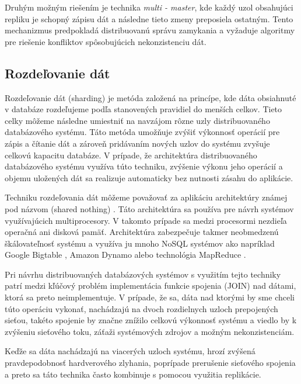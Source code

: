 \documentclass[11pt,twoside,a4paper]{book}
\begin{document}
Druhým možným riešením je technika \emph{multi - master}, kde každý uzol obsahujúci repliku je schopný zápisu dát a následne tieto zmeny preposiela ostatným. Tento mechanizmus predpokladá distribuovanú správu zamykania a vyžaduje algoritmy pre riešenie konfliktov spôsobujúcich nekonzistenciu dát.


\subsection{Rozdeľovanie dát}

Rozdeľovanie dát (sharding) je metóda založená na princípe, kde dáta obsiahnuté v databáze rozdeľujeme podľa stanovených pravidiel do menších celkov. Tieto celky môžeme následne umiestniť na navzájom rôzne uzly distribuovaného databázového systému. Táto metóda umožňuje zvýšiť výkonnosť operácií pre zápis a čítanie dát a zároveň pridávaním nových uzlov do systému zvyšuje celkovú kapacitu databáze. V prípade, že architektúra distribuovaného databázového systému využíva túto techniku, zvýšenie výkonu jeho operácií a objemu uložených dát sa realizuje automaticky bez nutnosti zásahu do aplikácie. 

Techniku rozdeľovania dát môžeme považovať za aplikáciu architektúry známej pod názvom  (shared nothing) \cite{stonebraker1986case}. Táto architektúra sa používa pre návrh systémov využívajúcich multiprocesory. V takomto prípade sa medzi procesormi nezdieľa operačná ani disková pamäť. Architektúra zabezpečuje takmer neobmedzenú škálovateľnosť systému a využíva ju mnoho NoSQL systémov ako napríklad Google Bigtable \cite{chang2008bigtable}, Amazon Dynamo \cite{decandia2007dynamo} alebo technológia MapReduce \cite{dean2008mapreduce}.

Pri návrhu distribuovaných databázových systémov s využitím tejto techniky patrí medzi kľúčový problém implementácia funkcie spojenia (JOIN) nad dátami, ktorá sa preto neimplementuje. V prípade, že sa, dáta nad ktorými by sme chceli túto operáciu vykonať, nachádzajú na dvoch rozdielnych uzloch prepojených sieťou, takéto spojenie by značne znížilo celkovú výkonnosť systému a viedlo by k zvýšeniu sieťového toku, záťaži systémových zdrojov a možným nekonzistenciám.

Keďže sa dáta nachádzajú na viacerých uzloch systému, hrozí zvýšená pravdepodobnosť hardverového zlyhania, poprípade prerušenie sieťového spojenia a preto sa táto technika často kombinuje s pomocou využitia replikácie.
\end{document}
